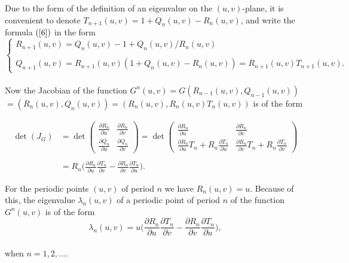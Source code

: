 \documentclass[12pt,a4paper]{amsart}
\numberwithin{equation}{section}
\numberwithin{lause}{section}
\begin{document}
Due to the form of the definition of an eigenvalue on the $(u,v)$-plane, it is convenient to denote
$T_{n+1}(u,v)=1+Q_{n}(u,v)-R_{n}(u,v)$, and write the formula $(\ref{6})$ in the form
\begin{displaymath}
\left\{\begin{array}{l}
      R_{n+1}(u,v)=Q_{n}(u,v)-1+Q_{n}(u,v)/R_{n}(u,v) \\ \\
      Q_{n+1}(u,v)=R_{n+1}(u,v)(1+Q_{n}(u,v)-R_{n}(u,v))=R_{n+1}(u,v)T_{n+1}(u,v).\label{622}
\end{array}\right.
\end{displaymath} \\
Now the Jacobian of the function $G^{n}(u,v)=G(R_{n-1}(u,v),Q_{n-1}(u,v))$ \\
$=(R_{n}(u,v),Q_{n}(u,v))=(R_{n}(u,v),R_{n}(u,v)T_{n}(u,v))$ is of the form


\begin{displaymath}
\begin{array}{ll}
\displaystyle{\det}(J_{G})&=\displaystyle{\det} \displaystyle{\begin{pmatrix}
  \displaystyle\frac{\partial R_{n}}{\partial u} &  \displaystyle\frac{\partial R_{n}}{\partial v} \\
  \displaystyle\frac{\partial Q_{n}}{\partial u} &  \displaystyle\frac{\partial Q_{n}}{\partial
  v}
\end{pmatrix}}=\displaystyle{\det} \displaystyle{\begin{pmatrix}
  \displaystyle\frac{\partial R_{n}}{\partial u} &  \displaystyle\frac{\partial R_{n}}{\partial v} \\
  \displaystyle\frac{\partial R_{n}}{\partial u}T_{n}+R_{n}\frac{\partial T_{n}}{\partial
  u}   & \displaystyle\frac{\partial R_{n}}{\partial v}T_{n}+R_{n}\frac{\partial T_{n}}{\partial
  v}
\end{pmatrix}}\\ \\
&=\displaystyle{R_{n}\Big(\frac{\partial R_{n}}{\partial u}\frac{\partial T_{n}}{\partial
  v}-\frac{\partial R_{n}}{\partial v}\frac{\partial T_{n}}{\partial  u}\Big)}.
  \end{array}
\end{displaymath}

For the periodic points $(u,v)$ of period $n$ we have $R_{n}(u,v)=u$. Because of this, the eigenvalue $\lambda_{n}(u,v)$ of a periodic point of period $n$ of the function $G^{n}(u,v)$ is of the form
\begin{equation}
    \lambda_{n}(u,v)=u\Big(\frac{\partial R_{n}}{\partial u}\frac{\partial T_{n}}{\partial
  v}-\frac{\partial R_{n}}{\partial v}\frac{\partial T_{n}}{\partial  u}\Big),  \label{50}
\end{equation} \\
when $n=1,2,\ldots$.
\end{document}
